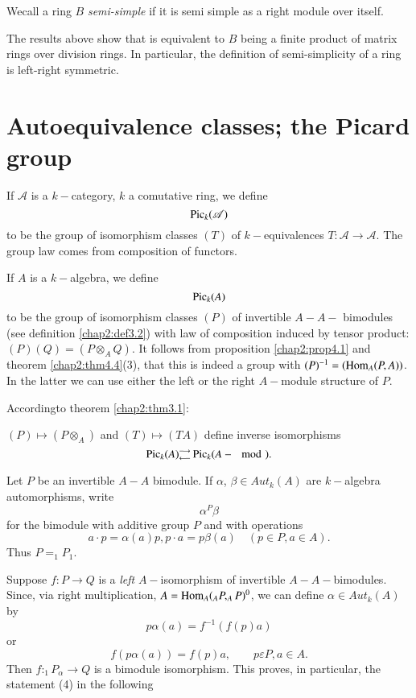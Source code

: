 \setcounter{definition}{7}
\begin{definition}%
We\pageoriginale call a ring $B$ {\em semi-simple} if it is semi
simple as a right module over itself.  
\end{definition}

The results above show that is equivalent to $B$ being a finite
product of matrix rings over division rings. In particular, the
definition of semi-simplicity of a ring is left-right symmetric. 


\section{Autoequivalence classes; the Picard group}%

If $\mathscr{A}$ is a $k-$category, $k$ a comutative ring, we define 
$$
\operatorname{Pic}_k (\mathscr{A})
$$	
to be the group of isomorphism classes $(T)$ of $k-$equivalences $T :
\mathscr{A} \to \mathscr{A}$. The group law comes from composition of
functors. 

If $A$ is a $k-$algebra, we define 
$$
\operatorname{Pic}_k (A)
$$
to be the group of isomorphism classes $(P)$ of invertible $A - A -$
bimodules (see definition \ref{chap2:def3.2}) with law of composition induced by
tensor product: $(P) (Q) = (P \otimes_A Q)$. It follows from
proposition \ref{chap2:prop4.1} and theorem \ref{chap2:thm4.4}(3),
that this is indeed a group with 
$(P)^{-1} = (\operatorname{Hom}_A(P, A))$. In the latter we can use either the left
or the right $A-$module structure of $P$. 

According\pageoriginale to theorem \ref{chap2:thm3.1}:

\begin{prop}\label{chap2:prop7.1} %
$(P) \mapsto (P \otimes_A)$ and $(T) \mapsto (TA)$ define
    inverse isomorphisms 
$$
\operatorname{Pic}_k(A )^{\longrightarrow}_{\longleftarrow} \operatorname{Pic}_k (A - \mod).
$$
\end{prop}

Let $P$ be an invertible $A- A$ bimodule. If $\alpha$, $\beta \in
Aut_k(A)$ are $k-$algebra automorphisms, write 
$$
\alpha^P \beta
$$
for the bimodule with additive group $P$ and with operations
$$
a \cdot p = \alpha(a)p, p \cdot a = p \beta(a) \quad  (p \in P, a\in A).
$$
Thus $P =_1 P_1$.

Suppose $f: P \to Q$ is a \textit{left} $A-$isomorphism of invertible
$A-A-$bimodules. Since, via right multiplication, $A = \operatorname{Hom}_A (_A P,
_AP)^0$, we can define $\alpha \in Aut_k(A)$ by 
$$
p \alpha(a) = f^{-1} (f(p)a) 
$$
or
$$
f(p \alpha(a)) = f(p)a,  \qquad p \varepsilon P, a \in A. 
$$
Then $f : _1P_\alpha \rightarrow Q$ is a bimodule isomorphism. This
proves, in particular, the statement (4) in the following 

